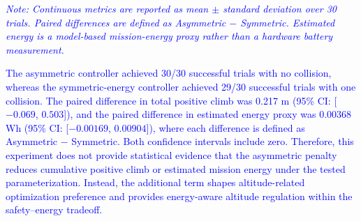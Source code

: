 \documentclass[lettersize,journal]{IEEEtran}
\begin{document}
\begin{table}[t]
	\centering
	\caption{\textcolor{blue}{Paired Ablation Results for the Asymmetric Climb Penalty over 30 Matched Scenarios}}
	\label{tab:asymmetric_climb_ablation}
	\footnotesize
	\renewcommand{\arraystretch}{1.15}
	\setlength{\tabcolsep}{2.5pt}
	\vspace{2pt}
	\begin{flushleft}
		\textcolor{blue}{\textit{Note: Continuous metrics are reported as mean $\pm$ standard deviation over 30 trials. Paired differences are defined as Asymmetric $-$ Symmetric. Estimated energy is a model-based mission-energy proxy rather than a hardware battery measurement.}}
	\end{flushleft}
\end{table}

\textcolor{blue}{The asymmetric controller achieved 30/30 successful trials with no collision, whereas the symmetric-energy controller achieved 29/30 successful trials with one collision. The paired difference in total positive climb was 0.217 m (95\% CI: [$-0.069$, $0.503$]), and the paired difference in estimated energy proxy was 0.00368 Wh (95\% CI: [$-0.00169$, $0.00904$]), where each difference is defined as Asymmetric $-$ Symmetric. Both confidence intervals include zero. Therefore, this experiment does not provide statistical evidence that the asymmetric penalty reduces cumulative positive climb or estimated mission energy under the tested parameterization. Instead, the additional term shapes altitude-related optimization preference and provides energy-aware altitude regulation within the safety--energy tradeoff.}
\end{document}
